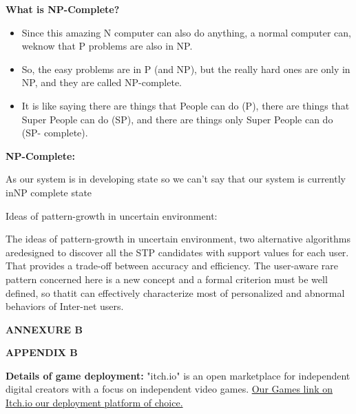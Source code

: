 \documentclass[12pt]{report}
\begin{document}
\vspace{1cm}

\textbf{What is NP-Complete?
}
\begin{itemize}
\item Since this amazing N computer can also do anything, a normal computer can, weknow 
that P problems are also in NP.
\item So, the easy problems are in P (and NP), but the really hard ones are only in
NP, and they are called NP-complete.
\item It is like saying there are things that People can do (P), there are things that Super 
People can do (SP), and there are things only Super People can do (SP- complete).
\end{itemize}
\textbf{NP-Complete:}

As our system is in developing state so we can’t say that our system is currently inNP
complete state

Ideas of pattern-growth in uncertain environment:

The ideas of pattern-growth in uncertain environment, two alternative algorithms aredesigned to 
discover all the STP candidates with support values for each user. That provides a trade-off 
between accuracy and efficiency. The user-aware rare pattern concerned here is a new concept 
and a formal criterion must be well defined, so thatit can effectively characterize most of
personalized and abnormal behaviors of Inter-net users.



\vspace{1cm}




\centering
\Large\textbf{ANNEXURE B}

\centering

\Large\textbf{APPENDIX B}\\
\justifying
\setlength{\parindent}{4em}
\setlength{\parskip}{0.5em}
\renewcommand{\baselinestretch}{1.5}
\normalsize
\raggedright\textbf{Details of game deployment:} "itch.io" is an open marketplace for independent digital creators with a focus on independent video games.
\href{https://sharanthakur.itch.io/infinite-pleasure-dodgeball}{Our Games link on Itch.io our deployment platform of choice.}

\vspace{1cm}


\vspace{0.1cm} 
\end{document}
